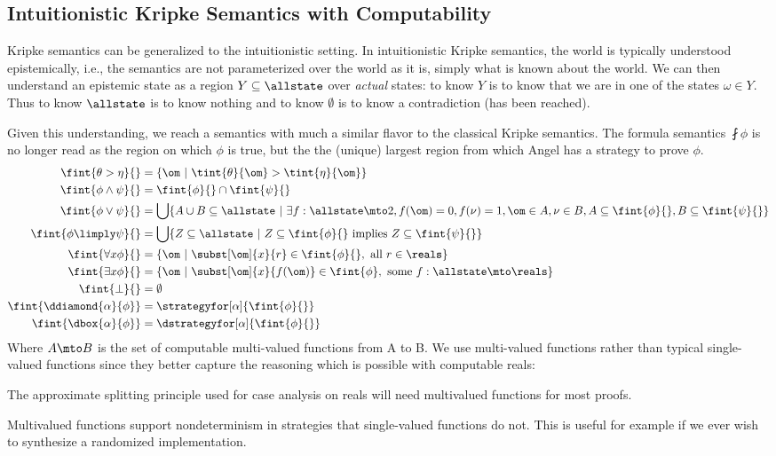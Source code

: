 \subsection{Intuitionistic Kripke Semantics with Computability}
Kripke semantics can be generalized to the intuitionistic setting.
In intuitionistic Kripke semantics, the world is typically understood epistemically, i.e., the semantics are not parameterized over the world as it is, simply what is known about the world.
We can then understand an epistemic state as a region $Y \subseteq \allstate$ over \emph{actual} states: to know $Y$ is to know that we are in one of the states $\omega \in Y$.
Thus to know $\allstate$ is to know nothing and to know $\emptyset$ is to know a contradiction (has been reached). 

Given this understanding, we reach a semantics with much a similar flavor to the classical Kripke semantics.
The formula semantics $\fint{\phi}{}$ is no longer read as the region on which $\phi$ is true, but the the (unique) largest region from which Angel has a strategy to prove $\phi$.
\begin{align*}
  \fint{\theta > \eta}{}         &= \{\om~|~\tint{\theta}{\om} > \tint{\eta}{\om}\}\\
  \fint{\phi \land \psi}{}       &= \fint{\phi}{} \cap \fint{\psi}{}\\
  \fint{\phi \lor \psi}{}        &= \bigcup\{A \cup B \subseteq \allstate~|~\exists f:\allstate\mto 2, f(\om)=0, f(\nu)=1, \om\in A, \nu \in B, A \subseteq \fint{\phi}{}, B \subseteq\fint{\psi}{}\}\\
  \fint{\phi \limply \psi}{}     &= \bigcup\{Z \subseteq \allstate ~|~ Z\subseteq\fint{\phi}{}\text{ implies }Z\subseteq\fint{\psi}{}\}\\
  \fint{\forall{x}{\phi}}{}      &= \{\om~|~\subst[\om]{x}{r}\in\fint{\phi}{}, \text{ all }r\in\reals\}\\
  \fint{\exists{x}{\phi}}{}      &= \{\om~|~\subst[\om]{x}{f(\om)}\in\fint{\phi},\text{ some }f:\allstate\mto \reals\}\\
  \fint{\bot}{}                  &= \emptyset  \\
  \fint{\ddiamond{\alpha}{\phi}} &= \strategyfor[\alpha]{\fint{\phi}{}}\\
  \fint{\dbox{\alpha}{\phi}}     &= \dstrategyfor[\alpha]{\fint{\phi}{}}
\end{align*}
Where $A \mto B$ is the set of computable multi-valued functions from A to B.
We use multi-valued functions rather than typical single-valued functions since they better capture the reasoning which is possible with computable reals:
\begin{inparaenum}
\item The approximate splitting principle used for case analysis on reals will need multivalued functions for most proofs.
\item Multivalued functions support nondeterminism in strategies that single-valued functions do not.
This is useful for example if we ever wish to synthesize a randomized implementation.
\end{inparaenum}

